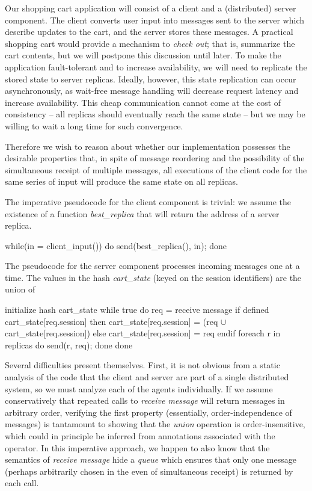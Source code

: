 Our shopping cart application will consist of a client and a (distributed)
server component.  The client converts user input into messages sent to
the server which describe updates to the cart, and the server stores these 
messages.  
A practical shopping cart would provide a mechanism to {\em check out}; that is,
summarize the cart contents, but we will postpone this discussion until later.
To make the application fault-tolerant and to increase availability, 
we will need to replicate the stored state to server replicas.  Ideally, however,
this state replication can occur asynchronously, as wait-free message handling
will decrease request latency and increase availability.  This cheap communication
cannot come at the cost of consistency -- all replicas should eventually reach
the same state -- but we may be willing to wait a long time for such convergence.

Therefore we wish to reason about whether our implementation possesses the desirable 
properties that, in spite of message reordering and the possibility of the simultaneous
receipt of multiple messages, all executions of the client code for the same series of
input will produce the same state on all replicas.  

The imperative pseudocode for the client component is trivial: we assume the existence
of a function {\em best\_replica} that will return the address of a server replica.

\begin{Dedalus}
while(in = client_input()) do
  send(best_replica(), in);
done
\end{Dedalus}


The pseudocode for the server component processes incoming messages one
at a time.  The values in the hash {\em cart\_state} (keyed on the session identifiers) 
are the union of 

\begin{Dedalus}
initialize hash cart_state
while true do
  req = receive message
  if defined cart_state[req.session] then
     cart_state[req.session] =  
       (req \(\cup\) cart_state[req.session]) 
  else 
    cart_state[req.session] = { req } 
  endif
  foreach r in replicas do
    send(r, req);
  done
done
\end{Dedalus}


Several difficulties present themselves.
First, it is not obvious from a static analysis of the code that the client and server are
part of a single distributed system, so we must analyze each of the agents individually.
If we assume conservatively that repeated calls to {\em receive message} will return messages in
arbitrary order, verifying the first property (essentially, order-independence of messages)
is tantamount to showing that the {\em union} operation is
order-insensitive, which could in principle be inferred from annotations associated
with the operator.
In this imperative approach, we happen to also know that the semantics of {\em receive message}
hide a {\em queue} which ensures that only one message (perhaps arbitrarily chosen in the
even of simultaneous receipt) is returned by each call.


